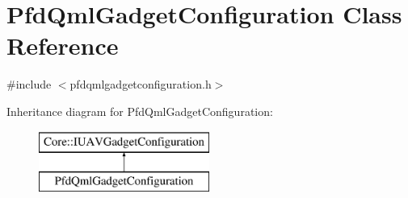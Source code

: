 \hypertarget{class_pfd_qml_gadget_configuration}{\section{\-Pfd\-Qml\-Gadget\-Configuration \-Class \-Reference}
\label{class_pfd_qml_gadget_configuration}
}


{\ttfamily \#include $<$pfdqmlgadgetconfiguration.\-h$>$}

\-Inheritance diagram for \-Pfd\-Qml\-Gadget\-Configuration\-:\begin{figure}[H]
\begin{center}
\leavevmode
\includegraphics[height=2.000000cm]{class_pfd_qml_gadget_configuration}
\end{center}
\end{figure}
